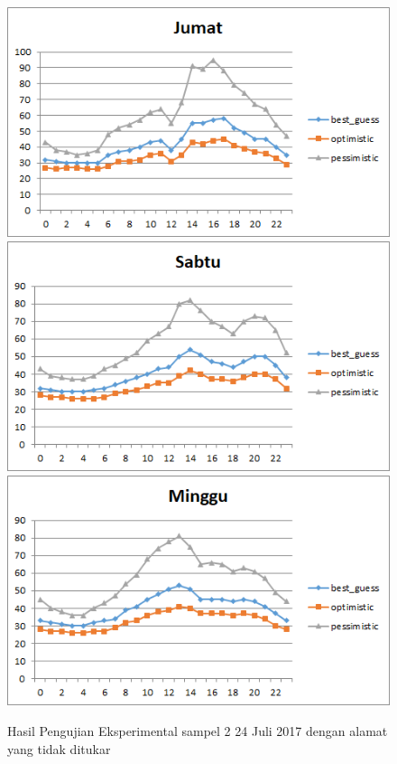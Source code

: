 \begin{figure}[H]
				\centering		
				\includegraphics[]{Gambar/jumatsampel224072017normal.png}
				\includegraphics[]{Gambar/sabtusampel224072017normal.png}
				\includegraphics[]{Gambar/minggusampel224072017normal.png}
				\caption[Hasil Pengujian Eksperimental]{Hasil Pengujian Eksperimental sampel 2 24 Juli 2017 dengan alamat yang tidak ditukar}
				\label{fig:eksperimentalsampel224072017normal}
\end{figure}

